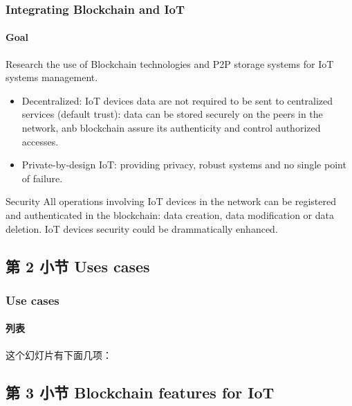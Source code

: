 \documentclass[
    aspectratio=169,                   %
]{beamer}
\begin{document}
    \begin{frame}
        \frametitle{Integrating Blockchain and IoT}

        \paragraph{Goal} Research the use of \alert{Blockchain technologies} and \alert{P2P storage systems} for IoT systems management.

        \begin{itemize}
            \item \alert{Decentralized}: IoT devices data are not required to be sent to centralized services (default trust): data can be stored securely on the peers in the network, anb blockchain assure its authenticity and control authorized accesses.
            \item \alert{Private-by-design IoT}: providing privacy, robust systems and no single point of failure.
        \end{itemize}

        \begin{block}{Security}
            All operations involving IoT devices in the network can be registered and authenticated in the blockchain: data creation, data modification or data deletion. IoT devices security could be drammatically enhanced.
        \end{block}

    \end{frame}

\subsection{第 2 小节 Uses cases}

    \begin{frame}
        \frametitle{Use cases}

        \paragraph{列表} 这个\alert{幻灯片}有下面几项：

    \end{frame}

\subsection{第 3 小节 Blockchain features for IoT}
\end{document}
